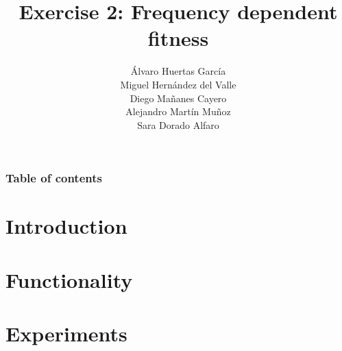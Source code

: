 \documentclass[11pt]{beamer}
\title[Frequency dependent fitness]{Exercise 2: Frequency dependent fitness}
\author[Group 5]{Álvaro Huertas García \\ Miguel Hernández del Valle \\ Diego Mañanes Cayero\\ 
                Alejandro Martín Muñoz \\Sara Dorado Alfaro }
\begin{document}
\frame{\titlepage}
\begin{frame}
    \frametitle{Table of contents}
    \tableofcontents
\end{frame}

\section{Introduction} 


\section{Functionality}


\section{Experiments}



\frame{\titlepage}
\end{document}
